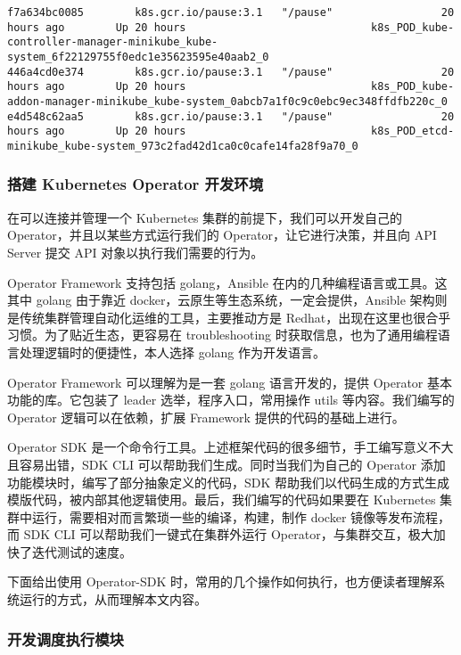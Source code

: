 \begin{lstlisting}
f7a634bc0085        k8s.gcr.io/pause:3.1   "/pause"                 20 hours ago        Up 20 hours                             k8s_POD_kube-controller-manager-minikube_kube-system_6f22129755f0edc1e35623595e40aab2_0
446a4cd0e374        k8s.gcr.io/pause:3.1   "/pause"                 20 hours ago        Up 20 hours                             k8s_POD_kube-addon-manager-minikube_kube-system_0abcb7a1f0c9c0ebc9ec348ffdfb220c_0
e4d548c62aa5        k8s.gcr.io/pause:3.1   "/pause"                 20 hours ago        Up 20 hours                             k8s_POD_etcd-minikube_kube-system_973c2fad42d1ca0c0cafe14fa28f9a70_0
\end{lstlisting}

\subsubsection{搭建 Kubernetes Operator 开发环境}

在可以连接并管理一个 Kubernetes 集群的前提下，我们可以开发自己的 Operator，并且以某些方式运行我们的 Operator，让它进行决策，并且向 API Server 提交 API 对象以执行我们需要的行为。

Operator Framework 支持包括 golang，Ansible 在内的几种编程语言或工具。这其中 golang 由于靠近 docker，云原生等生态系统，一定会提供，Ansible 架构则是传统集群管理自动化运维的工具，主要推动方是 Redhat，出现在这里也很合乎习惯。为了贴近生态，更容易在 troubleshooting 时获取信息，也为了通用编程语言处理逻辑时的便捷性，本人选择 golang 作为开发语言。

Operator Framework 可以理解为是一套 golang 语言开发的，提供 Operator 基本功能的库。它包装了 leader 选举，程序入口，常用操作 utils 等内容。我们编写的 Operator 逻辑可以在依赖，扩展 Framework 提供的代码的基础上进行。

Operator SDK 是一个命令行工具。上述框架代码的很多细节，手工编写意义不大且容易出错，SDK CLI 可以帮助我们生成。同时当我们为自己的 Operator 添加功能模块时，编写了部分抽象定义的代码，SDK 帮助我们以代码生成的方式生成模版代码，被内部其他逻辑使用。最后，我们编写的代码如果要在 Kubernetes 集群中运行，需要相对而言繁琐一些的编译，构建，制作 docker 镜像等发布流程，而 SDK CLI 可以帮助我们一键式在集群外运行 Operator，与集群交互，极大加快了迭代测试的速度。

下面给出使用 Operator-SDK 时，常用的几个操作如何执行，也方便读者理解系统运行的方式，从而理解本文内容。


\subsubsection{开发调度执行模块}

